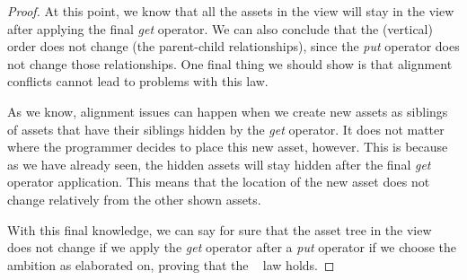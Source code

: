 \begin{proof}
  At this point, we know that all the assets in the view will stay in the view
  after applying the final \emph{get} operator. We can also conclude that the
  (vertical) order does not change (the parent-child relationships), since the
  \emph{put} operator does not change those relationships. One final thing we
  should show is that alignment conflicts cannot lead to problems with this law.

  As we know, alignment issues can happen when we create new assets as siblings
  of assets that have their siblings hidden by the \emph{get} operator. It does
  not matter where the programmer decides to place this new asset, however. This
  is because as we have already seen, the hidden assets will stay hidden after
  the final \emph{get} operator application. This means that the location of the
  new asset does not change relatively from the other shown assets.

  With this final knowledge, we can say for sure that the asset tree in the view
  does not change if we apply the \emph{get} operator after a \emph{put} operator
  if we choose the ambition as elaborated on, proving that the \putget~ law holds.
\end{proof}

